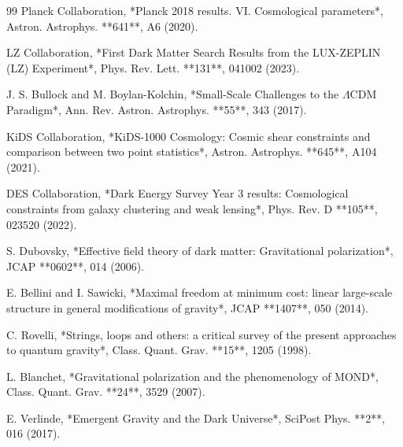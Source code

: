 \documentclass[10pt,twocolumn]{article}
\begin{document}
\begin{thebibliography}{99}
 Planck Collaboration, *Planck 2018 results. VI. Cosmological parameters*, Astron. Astrophys. **641**, A6 (2020).

 LZ Collaboration, *First Dark Matter Search Results from the LUX-ZEPLIN (LZ) Experiment*, Phys. Rev. Lett. **131**, 041002 (2023).

 J. S. Bullock and M. Boylan-Kolchin, *Small-Scale Challenges to the $\Lambda$CDM Paradigm*, Ann. Rev. Astron. Astrophys. **55**, 343 (2017).

 KiDS Collaboration, *KiDS-1000 Cosmology: Cosmic shear constraints and comparison between two point statistics*, Astron. Astrophys. **645**, A104 (2021).

 DES Collaboration, *Dark Energy Survey Year 3 results: Cosmological constraints from galaxy clustering and weak lensing*, Phys. Rev. D **105**, 023520 (2022).

 S. Dubovsky, *Effective field theory of dark matter: Gravitational polarization*, JCAP **0602**, 014 (2006).

 E. Bellini and I. Sawicki, *Maximal freedom at minimum cost: linear large-scale structure in general modifications of gravity*, JCAP **1407**, 050 (2014).

 C. Rovelli, *Strings, loops and others: a critical survey of the present approaches to quantum gravity*, Class. Quant. Grav. **15**, 1205 (1998).

 L. Blanchet, *Gravitational polarization and the phenomenology of MOND*, Class. Quant. Grav. **24**, 3529 (2007).

 E. Verlinde, *Emergent Gravity and the Dark Universe*, SciPost Phys. **2**, 016 (2017).
\end{thebibliography}
\end{document}
